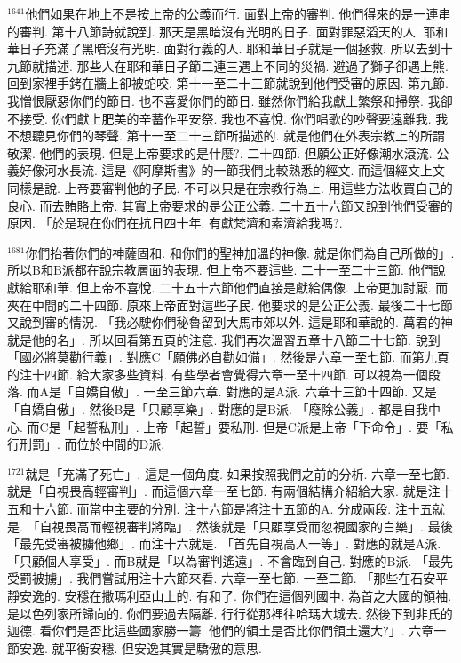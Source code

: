 \documentclass{book}
\begin{document}
$^{1641}$他們如果在地上不是按上帝的公義而行.
面對上帝的審判.
他們得來的是一連串的審判.
第十八節詩就說到.
那天是黑暗沒有光明的日子.
面對罪惡滔天的人.
耶和華日子充滿了黑暗沒有光明.
面對行義的人.
耶和華日子就是一個拯救.
所以去到十九節就描述.
那些人在耶和華日子節二連三遇上不同的災禍.
避過了獅子卻遇上熊.
回到家裡手銬在牆上卻被蛇咬.
第十一至二十三節就說到他們受審的原因.
第九節.
我憎恨厭惡你們的節日.
也不喜愛你們的節日.
雖然你們給我獻上繁祭和掃祭.
我卻不接受.
你們獻上肥美的辛蓄作平安祭.
我也不喜悅.
你們唱歌的吵聲要遠離我.
我不想聽見你們的琴聲.
第十一至二十三節所描述的.
就是他們在外表宗教上的所謂敬潔.
他們的表現.
但是上帝要求的是什麼?.
二十四節.
但願公正好像潮水滾流.
公義好像河水長流.
這是《阿摩斯書》的一節我們比較熟悉的經文.
而這個經文上文同樣是說.
上帝要審判他的子民.
不可以只是在宗教行為上.
用這些方法收買自己的良心.
而去賄賂上帝.
其實上帝要求的是公正公義.
二十五十六節又說到他們受審的原因.
「於是現在你們在抗日四十年.
有獻梵濟和素濟給我嗎?.

$^{1681}$你們抬著你們的神薩固和.
和你們的聖神加溫的神像.
就是你們為自己所做的」.
所以B和B派都在說宗教層面的表現.
但上帝不要這些.
二十一至二十三節.
他們說獻給耶和華.
但上帝不喜悅.
二十五十六節他們直接是獻給偶像.
上帝更加討厭.
而夾在中間的二十四節.
原來上帝面對這些子民.
他要求的是公正公義.
最後二十七節又說到審的情況.
「我必駛你們秘魯留到大馬市郊以外.
這是耶和華說的.
萬君的神就是他的名」.
所以回看第五頁的注意.
我們再次溫習五章十八節二十七節.
說到「國必將莫勸行義」.
對應C「願佛必自勸如備」.
然後是六章一至七節.
而第九頁的注十四節.
給大家多些資料.
有些學者會覺得六章一至十四節.
可以視為一個段落.
而A是「自嬌自傲」.
一至三節六章.
對應的是A派.
六章十三節十四節.
又是「自嬌自傲」.
然後B是「只顧享樂」.
對應的是B派.
「廢除公義」.
都是自我中心.
而C是「起誓私刑」.
上帝「起誓」要私刑.
但是C派是上帝「下命令」.
要「私行刑罰」.
而位於中間的D派.

$^{1721}$就是「充滿了死亡」.
這是一個角度.
如果按照我們之前的分析.
六章一至七節.
就是「自視畏高輕審判」.
而這個六章一至七節.
有兩個結構介紹給大家.
就是注十五和十六節.
而當中主要的分別.
注十六節是將注十五節的A.
分成兩段.
注十五就是.
「自視畏高而輕視審判將臨」.
然後就是「只顧享受而忽視國家的白樂」.
最後「最先受審被擄他鄉」.
而注十六就是.
「首先自視高人一等」.
對應的就是A派.
「只顧個人享受」.
而B就是「以為審判遙遠」.
不會臨到自己.
對應的B派.
「最先受罰被擄」.
我們嘗試用注十六節來看.
六章一至七節.
一至二節.
「那些在石安平靜安逸的.
安穩在撒瑪利亞山上的.
有和了.
你們在這個列國中.
為首之大國的領袖.
是以色列家所歸向的.
你們要過去隔離.
行行從那裡往哈瑪大城去.
然後下到非氏的迦德.
看你們是否比這些國家勝一籌.
他們的領土是否比你們領土還大?」.
六章一節安逸.
就平衡安穩.
但安逸其實是驕傲的意思.
\end{document}
